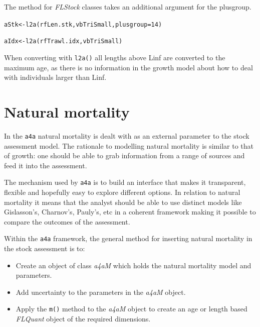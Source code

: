 \documentclass[a4paper,english,10pt]{article}\usepackage[]{graphicx}\usepackage[]{color}
\makeatletter
\newcommand{\hlnum}[1]{\textcolor[rgb]{0.2,0.2,0.2}{#1}}%
\newcommand{\hlstd}[1]{\textcolor[rgb]{0,0,0}{#1}}%
\newcommand{\hlkwb}[1]{\textcolor[rgb]{0.361,0.506,0.596}{#1}}%
\newcommand{\hlkwc}[1]{\textcolor[rgb]{0.361,0.506,0.596}{#1}}%
\newcommand{\hlkwd}[1]{\textcolor[rgb]{0.361,0.506,0.596}{#1}}%
\newenvironment{kframe}{%
 \def\at@end@of@kframe{}%
 \ifinner\ifhmode%
  \def\at@end@of@kframe{\end{minipage}}%
  \begin{minipage}{\columnwidth}%
 \fi\fi%
 \def\FrameCommand##1{\hskip\@totalleftmargin \hskip-\fboxsep
 \colorbox{shadecolor}{##1}\hskip-\fboxsep
     \hskip-\linewidth \hskip-\@totalleftmargin \hskip\columnwidth}%
 \MakeFramed {\advance\hsize-\width
   \@totalleftmargin\z@ \linewidth\hsize
   \@setminipage}}%
 {\par\unskip\endMakeFramed%
 \at@end@of@kframe}
\newenvironment{knitrout}{}{} %
\newcommand{\initiative}[1]{{\texttt{#1}}}
\newcommand{\code}[1]{{\texttt{#1}}}
\newcommand{\class}[1]{{\textit{#1}}}
\makeatother
\begin{document}
The method for \class{FLStock} classes takes an additional argument for the plusgroup.

\begin{knitrout}
\color{fgcolor}\begin{kframe}
\begin{alltt}
\hlstd{aStk} \hlkwb{<-} \hlkwd{l2a}\hlstd{(rfLen.stk, vbTriSmall,} \hlkwc{plusgroup}\hlstd{=}\hlnum{14}\hlstd{)}
\end{alltt}


{\ttfamily\noindent\bfseries\color{errorcolor}{\#\# Error: argument of length 0}}\begin{alltt}
\hlstd{aIdx} \hlkwb{<-} \hlkwd{l2a}\hlstd{(rfTrawl.idx, vbTriSmall)}
\end{alltt}


{\ttfamily\noindent\bfseries\color{errorcolor}{\#\# Error: argument of length 0}}\end{kframe}
\end{knitrout}

When converting with \code{l2a()} all lengths above Linf are converted to the maximum age, as there is no information in the growth model about how to deal with individuals larger than Linf. 

\pagebreak
\section{Natural mortality}\label{sec:M}

In the \initiative{a4a} natural mortality is dealt with as an external parameter to the stock assessment model. The rationale to modelling natural mortality is similar to that of growth: one should be able to grab information from a range of sources and feed it into the assessment.

The mechanism used by \initiative{a4a} is to build an interface that makes it transparent, flexible and hopefully easy to explore different options. In relation to natural mortality it means that the analyst should be able to use distinct models like Gislasson's, Charnov's, Pauly's, etc in a coherent framework making it possible to compare the outcomes of the assessment. 

Within the \initiative{a4a} framework, the general method for inserting natural mortality in the stock assessment is to:

\begin{itemize}
    \item Create an object of class \class{a4aM} which holds the natural mortality model and parameters.
    \item Add uncertainty to the parameters in the \class{a4aM} object.
    \item Apply the \code{m()} method to the \class{a4aM} object to create an age or length based \class{FLQuant} object of the required dimensions.
\end{itemize}
\end{document}
